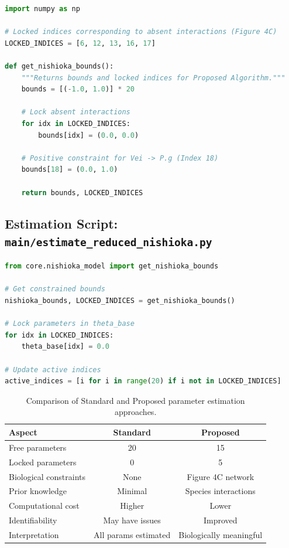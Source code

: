\documentclass[11pt,a4paper]{article}
\begin{document}
\begin{lstlisting}[language=Python]
import numpy as np

# Locked indices corresponding to absent interactions (Figure 4C)
LOCKED_INDICES = [6, 12, 13, 16, 17]

def get_nishioka_bounds():
    """Returns bounds and locked indices for Proposed Algorithm."""
    bounds = [(-1.0, 1.0)] * 20

    # Lock absent interactions
    for idx in LOCKED_INDICES:
        bounds[idx] = (0.0, 0.0)

    # Positive constraint for Vei -> P.g (Index 18)
    bounds[18] = (0.0, 1.0)

    return bounds, LOCKED_INDICES
\end{lstlisting}

\subsection{Estimation Script: \texttt{main/estimate\_reduced\_nishioka.py}}

\begin{lstlisting}[language=Python]
from core.nishioka_model import get_nishioka_bounds

# Get constrained bounds
nishioka_bounds, LOCKED_INDICES = get_nishioka_bounds()

# Lock parameters in theta_base
for idx in LOCKED_INDICES:
    theta_base[idx] = 0.0

# Update active indices
active_indices = [i for i in range(20) if i not in LOCKED_INDICES]
\end{lstlisting}


\begin{table}[h]
\centering
\begin{tabular}{lcc}
\toprule
\textbf{Aspect} & \textbf{Standard} & \textbf{Proposed} \\
\midrule
Free parameters & 20 & 15 \\
Locked parameters & 0 & 5 \\
Biological constraints & None & Figure 4C network \\
Prior knowledge & Minimal & Species interactions \\
Computational cost & Higher & Lower \\
Identifiability & May have issues & Improved \\
Interpretation & All params estimated & Biologically meaningful \\
\bottomrule
\end{tabular}
\caption{Comparison of Standard and Proposed parameter estimation approaches.}
\label{tab:comparison}
\end{table}
\end{document}
